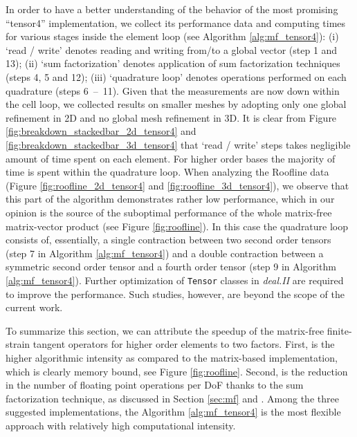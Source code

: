 \documentclass[times,doublespace]{nmeauth}
\begin{document}
{



In order to have a better understanding of the behavior of the most promising ``tensor4'' implementation,
we collect its performance data and computing times for various stages inside the element loop (see Algorithm \ref{alg:mf_tensor4}):
(i) `read / write' denotes reading and writing from/to a global vector (step 1 and 13);
(ii) `sum factorization' denotes application of sum factorization techniques (steps 4, 5 and 12);
(iii) `quadrature loop' denotes operations performed on each quadrature (steps \mbox{6 -- 11}).
Given that the measurements are now down within the cell loop, we collected results on smaller meshes by adopting only one
global refinement in 2D and no global mesh refinement in 3D.
It is clear from Figure \ref{fig:breakdown_stackedbar_2d_tensor4} and  \ref{fig:breakdown_stackedbar_3d_tensor4} that
`read / write' steps takes negligible amount of time spent on each element.
For higher order bases the majority of time is spent within the quadrature loop.
When analyzing the Roofline data (Figure \ref{fig:roofline_2d_tensor4} and \ref{fig:roofline_3d_tensor4}),
we observe that this part of the algorithm demonstrates rather low performance, which in our opinion is the source of the
suboptimal performance of the whole matrix-free matrix-vector product (see Figure \ref{fig:roofline}).
In this case the quadrature loop consists of, essentially, a
single contraction between two second order tensors (step 7 in Algorithm \ref{alg:mf_tensor4}) and a
double contraction between a symmetric second order tensor and a fourth order tensor (step 9 in Algorithm \ref{alg:mf_tensor4}).
Further optimization of \texttt{Tensor} classes in \textit{deal.II} are required to
improve the performance.
Such studies, however, are beyond the scope of the current work.
}

{\color{red}
To summarize this section, we can attribute the speedup of the matrix-free finite-strain tangent operators for higher order elements to two factors.
First, is the higher algorithmic intensity as compared to the matrix-based implementation, which is clearly memory
bound, see Figure \ref{fig:roofline}.
Second, is the reduction in the number of floating point operations per DoF thanks to the sum factorization technique, as discussed in
Section \ref{sec:mf} and \cite[Section 2.4]{kronbichler12}.
Among the three suggested implementations, the Algorithm \ref{alg:mf_tensor4} is the most flexible approach with relatively high computational intensity.
}
\end{document}
